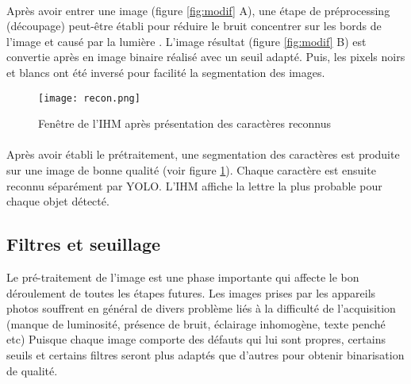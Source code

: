 \documentclass[a4paper]{article}
\begin{document}
			\paragraph{}
				Après avoir entrer une image (figure \ref{fig:modif} A), une étape de préprocessing (découpage) peut-être établi pour réduire le bruit concentrer sur les bords de l'image et causé par la lumière .
				L'image résultat (figure \ref{fig:modif} B) est convertie après en image binaire réalisé avec un seuil adapté. Puis, les pixels noirs et blancs ont été inversé pour facilité la segmentation des images.
			\begin{figure}[H]
				\centering
				\texttt{[image: recon.png]}
				\caption{Fenêtre de l'IHM après présentation des caractères reconnus}
				\label{fig:recon}
			\end{figure}

			\paragraph{} Après avoir établi le prétraitement, une segmentation des caractères est produite sur une image de bonne qualité (voir figure \ref{fig:recon}). Chaque caractère est ensuite reconnu séparément par YOLO. L'IHM affiche la lettre la plus probable pour chaque objet détecté.


			\vspace*{1.5cm}
			\subsection{Filtres et seuillage}
			Le pré-traitement de l'image est une phase importante qui affecte le bon déroulement de toutes les étapes futures. Les images prises par les appareils photos souffrent en général de divers problème liés à la difficulté de l'acquisition (manque de luminosité, présence de bruit, éclairage inhomogène, texte penché etc)
			Puisque chaque image comporte des défauts qui lui sont propres, certains seuils et certains filtres seront plus adaptés que d'autres pour obtenir binarisation de qualité.
			
\end{document}
